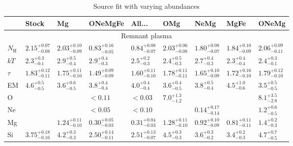 \documentclass[preprint2,tighten,trackchanges]{aastex6}
\newcommand*{\nH}{N_{\mathrm{H}}}
\newcommand*{\kB}{k}  %
\begin{document}
\begin{table*}[!ht]
    \centering
    \caption{Source fit with varying abundances \label{tab:src-varyabund}}

\begin{tabular}{@{}lllllllll@{}}
\toprule
 & Stock & Mg & ONeMgFe & All... & OMg & NeMg & MgFe & ONeMg \\
\midrule
\multicolumn{9}{c}{Remnant plasma} \\
\midrule
$\nH$   & ${2.15}^{+0.07}_{-0.08}$ & ${2.03}^{+0.10}_{-0.09}$ & ${0.83}^{+0.16}_{-0.05}$ & ${0.84}^{+0.08}_{-0.07}$
            & ${2.03}^{+0.06}_{-0.08}$ & ${1.80}^{+0.08}_{-0.07}$ & ${1.84}^{+0.10}_{-0.09}$ & ${2.06}^{+0.09}_{-0.11}$ \\ [0.5em]
$\kB T$ & ${2.3}^{+0.3}_{-0.1}$    & ${2.9}^{+0.5}_{-0.4}$ & ${2.9}^{+0.4}_{-0.3}$ & ${2.5}^{+0.2}_{-0.3}$
            & ${2.4}^{+0.5}_{-0.3}$ & ${2.7}^{+0.4}_{-0.3}$ & ${2.3}^{+0.4}_{-0.4}$ & ${2.4}^{+0.3}_{-0.1}$ \\ [0.5em]
$\tau$  & ${1.83}^{+0.12}_{-0.11}$ & ${1.75}^{+0.11}_{-0.10}$ & ${1.49}^{+0.09}_{-0.09}$ & ${1.60}^{+0.11}_{-0.10}$
            & ${1.78}^{+0.11}_{-0.11}$ & ${1.65}^{+0.10}_{-0.09}$ & ${1.72}^{+0.16}_{-0.10}$ & ${1.79}^{+0.12}_{-0.10}$ \\ [0.5em]
EM      & ${4.6}^{+0.5}_{-0.5}$ & ${3.6}^{+0.6}_{-0.5}$ & ${3.8}^{+0.4}_{-0.4}$ & ${4.0}^{+0.4}_{-0.4}$
        & ${3.6}^{+0.4}_{-0.5}$ & ${3.8}^{+0.5}_{-0.4}$ & ${4.5}^{+1.0}_{-0.6}$ & ${3.5}^{+0.5}_{-0.5}$ \\ [0.5em]
O  &                          &                          & $< 0.11$                 & $< 0.03$                 & ${7.0}^{+1.3}_{-1.2}$    &                          &                          & ${8.1}^{+3.5}_{-2.8}$ \\ [0.5em]
Ne &                          &                          & $< 0.05$                 & $< 0.10$                 &                          & ${0.14}^{+0.17}_{-0.14}$ &                          & ${1.2}^{+0.6}_{-0.5}$ \\ [0.5em]
Mg &                          & ${1.24}^{+0.11}_{-0.10}$ & ${0.30}^{+0.05}_{-0.03}$ & ${0.31}^{+0.04}_{-0.03}$ & ${1.28}^{+0.11}_{-0.10}$ & ${0.92}^{+0.10}_{-0.09}$ & ${0.81}^{+0.11}_{-0.11}$ & ${1.4}^{+0.2}_{-0.3}$ \\ [0.5em]
Si & ${3.75}^{+0.18}_{-0.16}$ & ${4.2}^{+0.3}_{-0.3}$    & ${2.50}^{+0.14}_{-0.11}$ & ${2.51}^{+0.13}_{-0.07}$ & ${4.5}^{+0.3}_{-0.3}$    & ${3.6}^{+0.3}_{-0.2}$    & ${3.4}^{+0.2}_{-0.3}$    & ${4.7}^{+0.7}_{-0.5}$ \\ [0.5em]

\end{tabular}
\end{table*}
\end{document}
